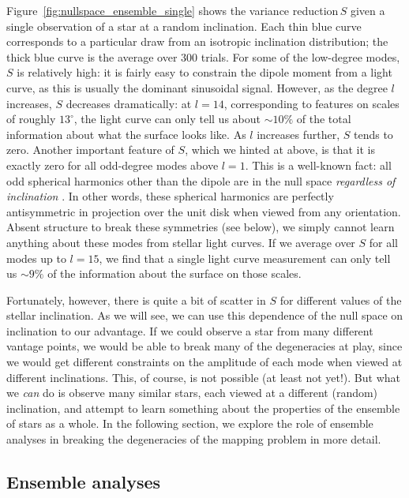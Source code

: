 \documentclass[modern,linenumbers]{aastex62}
\newcommand{\shrinkage}{{variance reduction\,}}
\begin{document}
Figure~\ref{fig:nullspace_ensemble_single} shows the \shrinkage $S$
given a single observation of a star at a random inclination.
Each thin blue curve corresponds to a particular draw from an isotropic
inclination distribution; the thick blue curve is the average over 300 trials.
For some of the low-degree modes, $S$ is relatively high: it is
fairly easy to constrain the dipole moment from a light curve, as this is
usually the dominant sinusoidal signal. However, as the degree $l$
increases, $S$ decreases dramatically: at $l = 14$, corresponding
to features on scales of roughly $13^\circ$, the light curve
can only tell us about $\sim 10\%$ of the total information about what the
surface looks like. As $l$ increases further, $S$ tends to zero.
Another important feature of $S$, which we hinted at above,
is that it is exactly zero for
all odd-degree modes above $l = 1$. This is a well-known fact: all odd spherical
harmonics other than the dipole are in the null space \emph{regardless of
    inclination} \citep[e.g.,][]{Luger2019}. In other words, these spherical
harmonics are perfectly antisymmetric in projection over the unit disk
when viewed from any orientation. Absent structure to break these symmetries
(see below), we simply cannot learn anything about these modes from
stellar light curves. If we average over $S$ for all modes up to $l=15$,
we find that a single light curve measurement can only tell us $\sim 9\%$
of the information about the surface on those scales.

Fortunately, however, there is quite a bit of scatter in $S$
for different values of the stellar inclination.
As we will see, we can use this dependence of the null space on inclination to our
advantage. If we could observe a star from many different vantage points,
we would be able to break many of the degeneracies at play, since we
would get different constraints on the amplitude of each mode when viewed
at different inclinations. This, of course, is not possible (at least not
yet!). But what we \emph{can} do is observe many similar stars, each viewed
at a different (random) inclination, and attempt to learn something about
the properties of the ensemble of stars as a whole.
In the
following section, we explore the role of ensemble analyses in breaking
the degeneracies of the mapping problem in more detail.


\subsection{Ensemble analyses}
\label{sec:ensemble}
\end{document}
